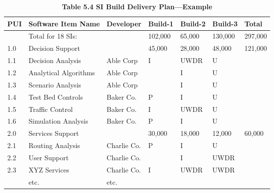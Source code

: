 \documentclass{book}
\begin{document}
	\begin{table}
		\begin{center}
			
		\caption{\textbf{Table 5.4 SI Build Delivery Plan—Example}}
		\label{Table 5.4}
		\begin{tabular}{|l |l |l |l |l |l |l|}
			\hline PUI & Software Item Name & Developer & Build-1 & Build-2 & Build-3 & Total\\
			\hline    & Total for 18 SIs: &  & 102,000 & 65,000 & 130,000 & 297,000\\
			\hline 1.0 & Decision Support & & 45,000 & 28,000 & 48,000 & 121,000\\
			\hline 1.1 & Decision Analysis & Able Corp & I & UWDR & U & \\
			\hline 1.2 & Analytical Algorithms & Able Corp &  & I & U & \\
			\hline 1.3 & Scenario Analysis & Able Corp &  & I & U & \\
			\hline 1.4 & Test Bed Controls & Baker Co. & P & I & U & \\
			\hline 1.5 & Traffic Control & Baker Co. & I & UWDR & U & \\
			\hline 1.6 & Simulation Analysis & Baker Co. & P & I & U & \\
			\hline 2.0 & Services Support & & 30,000 & 18,000 & 12,000 & 60,000\\
			\hline 2.1 & Routing Analysis & Charlie Co. & P & I & U & \\
			\hline 2.2 & User Support & Charlie Co. &  & I & UWDR & \\
			\hline 2.3 & XYZ Services & Charlie Co. & I  & UWDR & UWDR &\\
			\hline  & etc. & etc.& & & & \\
			\hline
		\end{tabular}
		\end{center}
	\end{table}
	
\end{document}
